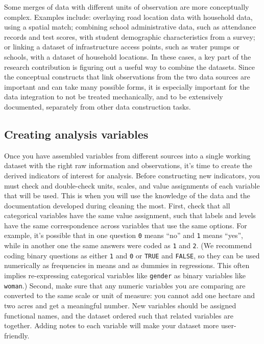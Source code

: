 Some merges of data with different units of observation
are more conceptually complex.
Examples include: overlaying road location data with household data,
using a spatial match; combining school administrative data, such as attendance records and test scores,
with student demographic characteristics from a survey;
or linking a dataset of infrastructure access points, such as water pumps or schools,
with a dataset of household locations.
In these cases, a key part of the research contribution is figuring out
a useful way to combine the datasets.
Since the conceptual constructs that link observations from the two data sources
are important and can take many possible forms,
it is especially important for the data integration to not be treated mechanically,
and to be extensively documented, separately from other data construction tasks.


\subsection{Creating analysis variables}

Once you have assembled variables from different sources into a single working dataset
with the right raw information and observations,
it's time to create the derived indicators of interest for analysis.
Before constructing new indicators,
you must check and double-check units, scales, and value assignments of each variable that will be used.
This is when you will use the knowledge
of the data and the documentation developed during cleaning the most.
First, check that all categorical variables have the same value assignment,
such that labels and levels have the same correspondence across variables that use the same options.
For example, it's possible that in one question \texttt{0} means ``no'' and \texttt{1} means ``yes'',
while in another one the same answers were coded as \texttt{1} and \texttt{2}.
(We recommend coding binary questions as either \texttt{1} and \texttt{0} or \texttt{TRUE} and \texttt{FALSE},
so they can be used numerically as frequencies in means and as dummies in regressions.
This often implies re-expressing categorical variables like \texttt{gender} as binary variables like \texttt{woman}.)
Second, make sure that any numeric variables you are comparing
are converted to the same scale or unit of measure:
you cannot add one hectare and two acres and get a meaningful number.
New variables should be assigned functional names,
and the dataset ordered such that related variables are together.
Adding notes to each variable will make your dataset more user-friendly.

